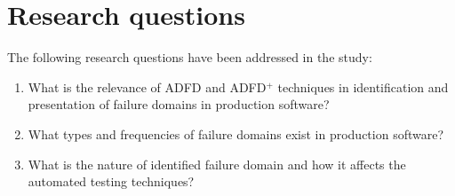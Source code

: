 \documentclass[runningheads,a4paper]{llncs}
\begin{document}
\section{Research questions} \label{sec:questions}
The following research questions have been addressed in the study:
\begin{enumerate}
%

\item What is the relevance of ADFD and ADFD$^+$ techniques in identification and presentation of failure domains in production software?




%
%
\item What types and frequencies of failure domains exist in production software?
%
\item What is the nature of identified failure domain and how it affects the automated testing techniques?


\end{enumerate}
\end{document}
